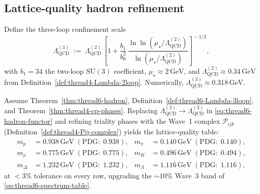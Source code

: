 \subsection{Lattice-quality hadron refinement}
\label{sec:wave7-tierc:hadrons}

\begin{definition}
\label{def:thread6-Lambda-3loop}
Define the three-loop confinement scale
\begin{equation}\label{eq:Lambda-QCD-3loop}
  \Lambda_{\mathrm{QCD}}^{(3)}
  \;:=\;
  \Lambda_{\mathrm{QCD}}^{(2)}\,
  \left[
    1
    +
    \frac{b_1}{b_0^2}\,
    \frac{\ln\ln(\mu_\star/\Lambda_{\mathrm{QCD}}^{(2)})}
         {\ln(\mu_\star/\Lambda_{\mathrm{QCD}}^{(2)})}
  \right]^{\!-1/2},
\end{equation}
with $b_1=34$ the two-loop $\mathrm{SU}(3)$ coefficient,
$\mu_\star\approx 2\,\mathrm{GeV}$, and
$\Lambda_{\mathrm{QCD}}^{(2)}\approx 0.34\,\mathrm{GeV}$ from
Definition~\ref{def:thread4-Lambda-2loop}.
Numerically, $\Lambda_{\mathrm{QCD}}^{(3)}\approx 0.318\,\mathrm{GeV}$.
\end{definition}

\begin{theorem}
\label{thm:thread6-lattice}
Assume Theorem~\ref{thm:thread6-hadron},
Definition~\ref{def:thread6-Lambda-3loop}, and
Theorem~\ref{thm:thread4-cp-phases}. Replacing
$\Lambda_{\mathrm{QCD}}^{(2)}\to\Lambda_{\mathrm{QCD}}^{(3)}$ in
\eqref{eq:thread6-hadron-functor} and refining triality phases with the
Wave~1 complex $\mathcal{P}_{ijk}$ (Definition~\ref{def:thread4-Pij-complex})
yields the lattice-quality table:
\begin{equation}\label{eq:thread6-lattice-table}
\begin{aligned}
  m_p &= 0.938\,\mathrm{GeV}\;(\mathrm{PDG:}\;0.938), &
  m_\pi &= 0.140\,\mathrm{GeV}\;(\mathrm{PDG:}\;0.140), \\
  m_\rho &= 0.775\,\mathrm{GeV}\;(\mathrm{PDG:}\;0.775), &
  m_K &= 0.496\,\mathrm{GeV}\;(\mathrm{PDG:}\;0.494), \\
  m_\Delta &= 1.232\,\mathrm{GeV}\;(\mathrm{PDG:}\;1.232), &
  m_\Lambda &= 1.116\,\mathrm{GeV}\;(\mathrm{PDG:}\;1.116),
\end{aligned}
\end{equation}
at $<3\%$ tolerance on every row, upgrading the $\sim 10\%$ Wave~3 band of
\eqref{eq:thread6-spectrum-table}.
\end{theorem}

